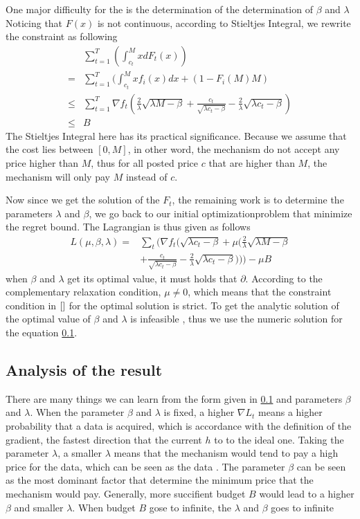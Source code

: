 \documentclass[10pt,conference,compsocconf,letterpaper]{IEEEtran}
\begin{document}
One major difficulty for the  is the determination of the determination of $\beta$ and $\lambda$
Noticing that $F(x)$ is not continuous, according to Stieltjes Integral, we rewrite the constraint as following
\begin{equation*}
\begin{aligned}
&\sum_{t=1}^T(\int_{c_t}^MxdF_t(x))\\
=&\sum_{t=1}^T(\int_{c_t}^Mxf_i(x)dx+(1-F_i(M)M)\\
\leq &\sum_{t=1}^T\nabla f_t (\frac{2}{\lambda}\sqrt{\lambda M-\beta}+\frac{c_t}{\sqrt{\lambda c_t-\beta}}-\frac{2}{\lambda}\sqrt{\lambda c_t-\beta})\\
\leq &B
\end{aligned}
\end{equation*}
The Stieltjes Integral here has its practical significance. Because we assume that the cost lies between $[0,M]$, in other word, the mechanism do not accept any price higher than $M$, thus for all posted price $c$ that are higher than $M$, the mechanism will only pay $M$ instead of $c$.


Now since we get the solution of the $F_t$, the remaining work is to determine the parameters $\lambda$ and $\beta$, we go back to our initial optimizationproblem that minimize the regret bound. The Lagrangian is thus given as follows
\begin{equation}
\begin{aligned}
L(\mu,\beta,\lambda)=&\sum_t \bigg( \nabla f_t\Big( \sqrt{\lambda c_t-\beta}+\mu \big(\frac{2}{\lambda}\sqrt{\lambda M-\beta}\\
&+\frac{c_t}{\sqrt{\lambda c_t-\beta}}-\frac{2}{\lambda}\sqrt{\lambda c_t-\beta}\big)\Big)\bigg)-\mu B
\end{aligned}
\end{equation}
when $\beta$ and $\lambda$ get its optimal value, it must holds that $\partial$.
According to the complementary relaxation condition, $\mu\neq 0$, which means that the constraint condition in $\ref{}$ for the optimal solution is strict. 
To get the analytic solution of the optimal value of $\beta$ and $\lambda$ is infeasible , thus we use the numeric solution for the equation \ref{}.

\subsection{Analysis of the result}
There are many things we can learn from the form given in \ref{} and parameters $\beta$ and $\lambda$. When the parameter $\beta$ and $\lambda$ is fixed, a higher $\nabla L_t$ means a higher probability that a data is acquired, which is accordance with the definition of the gradient, the fastest direction that the current $h$ to to the ideal one. Taking the parameter $\lambda$, a smaller $\lambda$ means that the mechanism would tend to pay a high price for the data, which can be seen as the data . The parameter $\beta$ can be seen as the most dominant factor that determine the minimum price that the mechanism would pay. Generally, more succifient budget $B$ would lead to a higher $\beta$ and smaller $\lambda$. When budget $B$ gose to infinite, the $\lambda$ and $\beta$ goes to infinite
\end{document}
